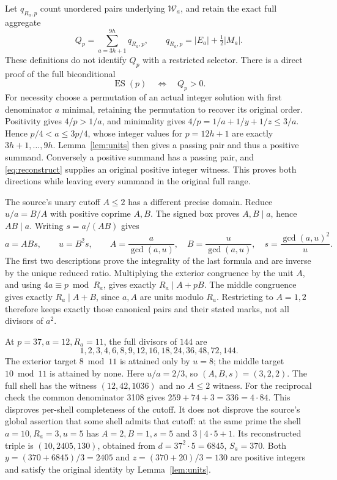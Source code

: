 \documentclass[11pt]{article}
\theoremstyle{definition}\newtheorem{definition}[theorem]{Definition}
\theoremstyle{remark}\newtheorem{remark}[theorem]{Remark}
\begin{document}
Let \(q_{R_a,p}\) count unordered pairs underlying
\(\mathcal W_a\), and retain the exact full aggregate
\[
 Q_p=\sum_{a=3h+1}^{9h}q_{R_a,p},\qquad
 q_{R_a,p}=|E_a|+\tfrac12|M_a|.
\]
These definitions do not identify \(Q_p\) with a restricted
selector.  There is a direct proof of the full biconditional
\[
 \operatorname{ES}(p)\quad\Longleftrightarrow\quad Q_p>0.
\]
For necessity choose a permutation of an actual integer
solution with first denominator \(a\) minimal, retaining
the permutation to recover its original order.  Positivity
gives \(4/p>1/a\), and minimality gives
\(4/p=1/a+1/y+1/z\le3/a\).  Hence
\(p/4<a\le3p/4\), whose integer values for \(p=12h+1\)
are exactly \(3h+1,\ldots,9h\).  Lemma~\ref{lem:units}
then gives a passing pair and thus a positive summand.
Conversely a positive summand has a passing pair, and
\eqref{eq:reconstruct} supplies an original positive
integer witness.  This proves both directions while
leaving every summand in the original full range.

The source's unary cutoff \(A\le2\) has a different
precise domain.  Reduce \(u/a=B/A\) with positive
coprime \(A,B\).  The signed box proves \(A,B\mid a\),
hence \(AB\mid a\).  Writing \(s=a/(AB)\) gives
\[
 a=ABs,\qquad u=B^2s,\qquad
 A=\frac{a}{\gcd(a,u)},\quad
 B=\frac{u}{\gcd(a,u)},\quad
 s=\frac{\gcd(a,u)^2}{u}.
\]
The first two descriptions prove the integrality of
the last formula and are inverse by the unique reduced
ratio.  Multiplying the exterior congruence by the
unit \(A\), and using \(4a\equiv p\bmod R_a\),
gives exactly \(R_a\mid A+pB\).  The middle congruence
gives exactly \(R_a\mid A+B\), since \(a,A\) are
units modulo \(R_a\).  Restricting to \(A=1,2\)
therefore keeps exactly those canonical pairs and
their stated marks, not all divisors of \(a^2\).

At \(p=37,a=12,R_a=11\), the full divisors of \(144\)
are
\[
 1,2,3,4,6,8,9,12,16,18,24,36,48,72,144 .
\]
The exterior target \(8\bmod11\) is attained only by
\(u=8\); the middle target \(10\bmod11\) is attained
by none.  Here \(u/a=2/3\), so \((A,B,s)=(3,2,2)\).
The full shell has the witness
\((12,42,1036)\) and no \(A\le2\) witness.
For the reciprocal check the common denominator 3108
gives \(259+74+3=336=4\cdot84\).
This disproves per-shell completeness of the cutoff.
It does not disprove the source's global assertion
that some shell admits that cutoff: at the same prime
the shell \(a=10,R_a=3,u=5\) has \(A=2,B=1,s=5\)
and \(3\mid4\cdot5+1\).  Its reconstructed triple is
\((10,2405,130)\), obtained from
\(d=37^2\cdot5=6845\), \(S_a=370\).
Both \(y=(370+6845)/3=2405\) and
\(z=(370+20)/3=130\) are positive integers and satisfy
the original identity by Lemma~\ref{lem:units}.
\end{document}
